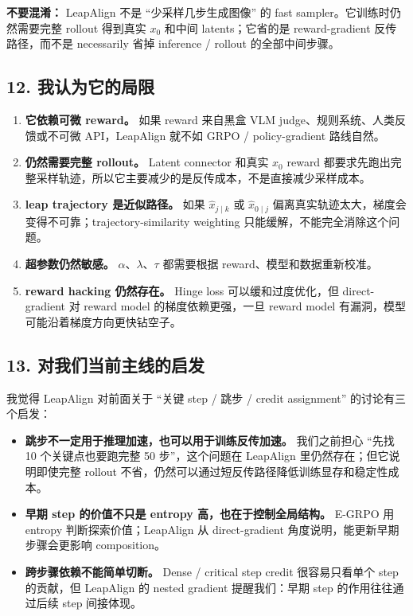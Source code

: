\begin{warnbox}
\textbf{不要混淆：} LeapAlign 不是 ``少采样几步生成图像'' 的 fast sampler。它训练时仍然需要完整 rollout 得到真实 \(x_0\) 和中间 latents；它省的是 reward-gradient 反传路径，而不是 necessarily 省掉 inference / rollout 的全部中间步骤。
\end{warnbox}

\subsection{12. 我认为它的局限}

\begin{enumerate}[leftmargin=1.5em]
  \item \textbf{它依赖可微 reward。} 如果 reward 来自黑盒 VLM judge、规则系统、人类反馈或不可微 API，LeapAlign 就不如 GRPO / policy-gradient 路线自然。
  \item \textbf{仍然需要完整 rollout。} Latent connector 和真实 \(x_0\) reward 都要求先跑出完整采样轨迹，所以它主要减少的是反传成本，不是直接减少采样成本。
  \item \textbf{leap trajectory 是近似路径。} 如果 \(\hat{x}_{j\mid k}\) 或 \(\hat{x}_{0\mid j}\) 偏离真实轨迹太大，梯度会变得不可靠；trajectory-similarity weighting 只能缓解，不能完全消除这个问题。
  \item \textbf{超参数仍然敏感。} \(\alpha\)、\(\lambda\)、\(\tau\) 都需要根据 reward、模型和数据重新校准。
  \item \textbf{reward hacking 仍然存在。} Hinge loss 可以缓和过度优化，但 direct-gradient 对 reward model 的梯度依赖更强，一旦 reward model 有漏洞，模型可能沿着梯度方向更快钻空子。
\end{enumerate}

\subsection{13. 对我们当前主线的启发}

我觉得 LeapAlign 对前面关于 ``关键 step / 跳步 / credit assignment'' 的讨论有三个启发：

\begin{itemize}[leftmargin=1.5em]
  \item \textbf{跳步不一定用于推理加速，也可以用于训练反传加速。} 我们之前担心 ``先找 10 个关键点也要跑完整 50 步''，这个问题在 LeapAlign 里仍然存在；但它说明即使完整 rollout 不省，仍然可以通过短反传路径降低训练显存和稳定性成本。
  \item \textbf{早期 step 的价值不只是 entropy 高，也在于控制全局结构。} E-GRPO 用 entropy 判断探索价值；LeapAlign 从 direct-gradient 角度说明，能更新早期步骤会更影响 composition。
  \item \textbf{跨步骤依赖不能简单切断。} Dense / critical step credit 很容易只看单个 step 的贡献，但 LeapAlign 的 nested gradient 提醒我们：早期 step 的作用往往通过后续 step 间接体现。
\end{itemize}

